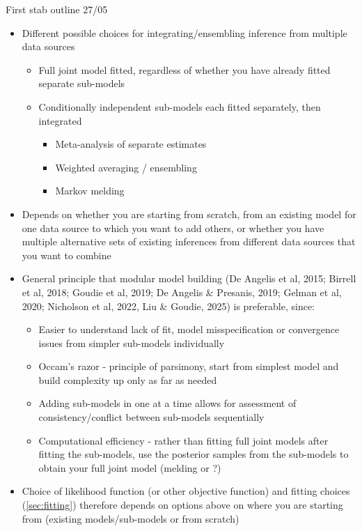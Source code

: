 \documentclass{article}
\begin{document}
First stab outline 27/05
\begin{itemize}
    \item Different possible choices for integrating/ensembling inference from multiple data sources
    \begin{itemize}
        \item Full joint model fitted, regardless of whether you have already fitted separate sub-models
        \item Conditionally independent sub-models each fitted separately, then integrated
        \begin{itemize}
            \item Meta-analysis of separate estimates
            \item Weighted averaging / ensembling
            \item Markov melding
        \end{itemize}
    \end{itemize}
    \item Depends on whether you are starting from scratch, from an existing model for one data source to which you want to add others, or whether you have multiple alternative sets of existing inferences from different data sources that you want to combine
    \item General principle that modular model building (De Angelis et al, 2015; Birrell et al, 2018; Goudie et al, 2019; De Angelis \& Presanis, 2019; Gelman et al, 2020; Nicholson et al, 2022, Liu \& Goudie, 2025) is preferable, since:
    \begin{itemize}
        \item Easier to understand lack of fit, model misspecification or convergence issues from simpler sub-models individually
        \item Occam's razor - principle of parsimony, start from simplest model and build complexity up only as far as needed
        \item Adding sub-models in one at a time allows for assessment of consistency/conflict between sub-models sequentially
        \item Computational efficiency - rather than fitting full joint models after fitting the sub-models, use the posterior samples from the sub-models to obtain your full joint model (melding or ?)
    \end{itemize}
    \item Choice of likelihood function (or other objective function) and fitting choices (\ref{sec:fitting}) therefore depends on options above on where you are starting from (existing models/sub-models or from scratch)

\end{itemize}
\end{document}
